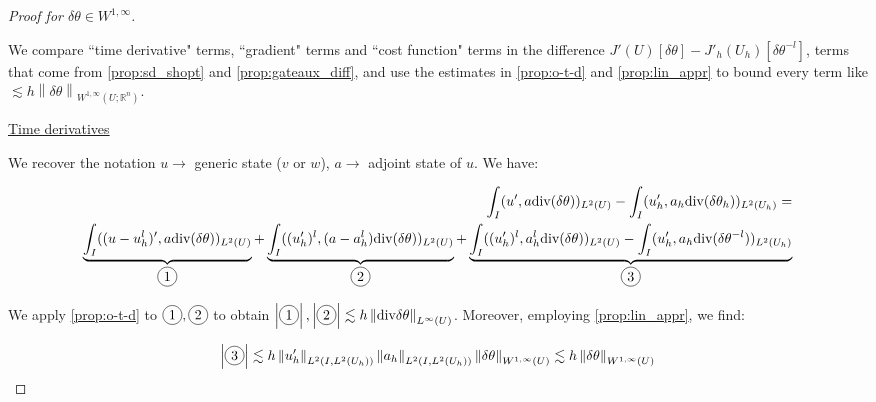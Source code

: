 \documentclass[english,a4paper,9pt,oneside]{scrbook}	%
\theoremstyle{break}
\newenvironment{mproof}[1][\proofname]{%
  \begin{proof}[#1]$ $\par\nobreak\ignorespaces
}{%
  \end{proof}
}
\renewcommand*{\proofname}{Proof}
\theoremstyle{remark}
\newcommand{\mR}{\mathbb{R}}
\newcommand{\ds}{\displaystyle}
\newcommand{\norm}[1]{\left\lVert#1\right\rVert}
\newcommand{\te}{\theta}
\newcommand{\dive}{\text{div}}
\newcommand*\circled[1]{\tikz[baseline=(char.base)]{
            \node[shape=circle,draw,inner sep=2pt] (char) {#1};}}
\begin{document}
\begin{mproof}[Proof for $\delta \te \in W^{1,\infty}$]
We compare ``time derivative" terms, ``gradient" terms and ``cost function" terms in the difference $\ds J'(U)[\delta \te] - J'_h(U_h)[\delta \te^{-l}]$, terms that come from \cref{prop:sd_shopt} and \cref{prop:gateaux_diff}, and use the estimates in \cref{prop:o-t-d} and \cref{prop:lin_appr} to bound every term like $\lesssim h \norm{\delta \te}_{W^{1,\infty}(U;\mR^n)}$. 


\underline{Time derivatives}

We recover the notation $u\rightarrow$ generic state ($v$ or $w$), $a\rightarrow$ adjoint state of $u$.
We have:

\begin{align*}
	\int_I(u',a\dive(\delta \te))_{L^2(U)}-\int_I (u_h',a_h\dive(\delta \te_h))_{L^2(U_h)}=\\
	\underbrace{\int_I((u-u_h^l)',a\dive(\delta \te))_{L^2(U)}}_{\circled{1}}+
	\underbrace{\int_I((u_h')^l, (a-a_h^l)\dive(\delta \te))_{L^2(U)}}_{\circled{2}}+
	\underbrace{\int_I((u_h')^l, a_h^l\dive(\delta \te))_{L^2(U)}-\int_I (u_h',a_h\dive(\delta \te^{-l}))_{L^2(U_h)}}_{\circled{3}}
\end{align*}



We apply  \cref{prop:o-t-d} to $\circled{1}, \circled{2}$ to obtain $\ds  \left | \circled{1} \right |,  \left | \circled{2} \right | \lesssim h\norm{\dive{\delta \theta}}_{L^\infty(U)}$. Moreover, employing \cref{prop:lin_appr}, we find:

\begin{align*}
	\left | \circled{3} \right |\lesssim  h \norm{u_h'}_{L^2(I,L^2(U_h))}\norm{a_h}_{L^2(I,L^2(U_h))}\norm{\delta \te}_{W^{1,\infty}(U)} \lesssim  h \norm{\delta \te}_{W^{1,\infty}(U)}
\end{align*}


\end{mproof}
\end{document}
